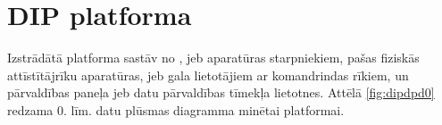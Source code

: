 
  






\section{DIP platforma}

Izstrādātā platforma sastāv no , 
jeb aparatūras starpniekiem, pašas fiziskās attīstītājrīku aparatūras,
 jeb gala lietotājiem ar komandrindas rīkiem, un
pārvaldības paneļa jeb datu pārvaldības tīmekļa lietotnes. Attēlā
\ref{fig:dipdpd0} redzama 0. līm. datu plūsmas diagramma minētai platformai. 


